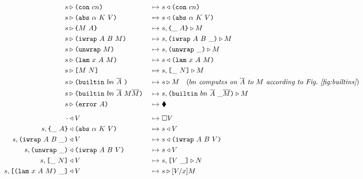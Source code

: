 \documentclass[../plutus-core-specification.tex]{subfiles}
\begin{document}
\begin{figure}[H]
\begin{subfigure}[c]{\linewidth}
\hspace{-1cm}\begin{minipage}{\linewidth}  
\begin{alignat*}{2}
        \cksteps{\ckforward{s&}{\con{cn}}&} {&\ckbackward{s}{\con{cn}}}\\
        \cksteps{\ckforward{s&}{\abs{\alpha}{K}{V}}&} {&\ckbackward{s}{\abs{\alpha}{K}{V}}}\\
        \cksteps{\ckforward{s&}{\inst{M}{A}}&} {&\ckforward{s, \inInstLeftFrame{A}}{M}}\\
        \cksteps{\ckforward{s&}{\wrap{A}{B}{M}}&} {&\ckforward{s, \inWrapRightFrame{A}{B}}{M}}\\
        \cksteps{\ckforward{s&}{\unwrap{M}}&} {&\ckforward{s, \inUnwrapFrame{}}{M}}\\
        \cksteps{\ckforward{s&}{\lam{x}{A}{M}}&} {&\ckbackward{s}{\lam{x}{A}{M}}}\\
        \cksteps{\ckforward{s&}{\app{M}{N}}&} {&\ckforward{s, \inAppLeftFrame{N}}{M}}\\
        \cksteps{\ckforward{s&}{\builtin{bn}{\repetition{A}}{}}&} {&\ckforward{s}{M}} 
              \quad (\textit{$bn$ computes on $\repetition{A}$ to $M$ according to Fig.~\ref{fig:builtins}})\\
        \cksteps{\ckforward{s&}{\builtin{bn}{\repetition{A}}{M \repetition{M}}}&} {&\ckforward{s, \inBuiltin{bn}{\repetition{A}}{}{\_}{\repetition{M}}}{M}}\\
        \cksteps{\ckforward{s&}{\error{A}}&} {&\ckerror{}}\\
        \\[-10pt] %
        \cksteps{\ckbackward{\cdot&}{V}&} {&\square V}\\
        \cksteps{\ckbackward{s, \inInstLeftFrame{A}&}{\abs{\alpha}{K}{V}}&} {&\ckbackward{s}{V}}\\
        \cksteps{\ckbackward{s, \inWrapRightFrame{A}{B}&}{V}&} {&\ckbackward{s}{\wrap{A}{B}{V}}}\\
        \cksteps{\ckbackward{s, \inUnwrapFrame{}&}{\wrap{A}{B}{V}}&} {&\ckbackward{s}{V}}\\
        \cksteps{\ckbackward{s, \inAppLeftFrame{N}&}{V}&} {&\ckforward{s, \inAppRightFrame{V}}{N}}\\
        \cksteps{\ckbackward{s, \inAppRightFrame{\lam{x}{A}{M}}&}{V}&} {&\ckforward{s}{\subst{V}{x}{M}}}\\

\end{alignat*}
\end{minipage}
\end{subfigure}
\end{figure}
\end{document}
